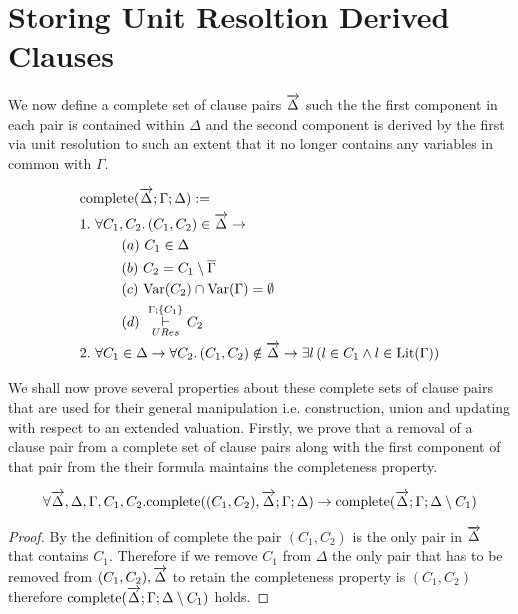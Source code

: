 \section{Storing Unit Resoltion Derived Clauses}

We now define a complete set of clause pairs $\overrightarrow{\Delta}$ such the the first component in each pair is contained within $\Delta$ and the second component is derived by the first via unit resolution to such an extent that it no longer contains any variables in common with $\Gamma$. \\
\medskip
\begin{mydef}
\begin{align*}
 &\mathrm{complete}(\overrightarrow{\Delta};\Gamma; \Delta) :=  \\
& 1. \ \forall C_1,C_2.  \, (C_1, C_2) \in \overrightarrow{\Delta} \to \\
& \hspace{30pt}  (a) \ C_1 \in \Delta \\
& \hspace{30pt}  (b) \ C_2 = C_1 \setminus \overline{\Gamma} \\
& \hspace{30pt}  (c) \ \mathrm{Var}(C_2) \cap \mathrm{Var}(\Gamma) = \emptyset \\
& \hspace{30pt}  (d) \  \overset{\Gamma;\{C_1 \}}{\underset{URes}{\vdash}} C_2 \\
&2. \ \forall C_1 \in \Delta \to \forall C_2. \, (C_1, C_2 ) \notin \overrightarrow{\Delta} \to \exists l \, (l \in C_1 \wedge l \in \mathrm{Lit}(\Gamma))
\end{align*}

\end{mydef}

We shall now prove several properties about these complete sets of clause pairs that are used for their general manipulation i.e. construction, union and updating with respect to an extended valuation. Firstly, we prove that a removal of a clause pair from a complete set of clause pairs along with the first component of that pair from the their formula maintains the completeness property. \\
\medskip
\begin{mylemma}\label{lem:comprem}
\begin{align*}
\forall \overrightarrow{\Delta},\Delta,\Gamma,C_1,C_2. \mathrm{complete}((C_1, C_2), \overrightarrow{\Delta};\Gamma; \Delta) \to \mathrm{complete}(\overrightarrow{\Delta};\Gamma; \Delta \setminus C_1)
\end{align*}
\begin{proof}
By the definition of complete the pair $(C_1, C_2)$ is the only pair in $\overrightarrow{\Delta}$ that contains $C_1$.  Therefore if we remove $C_1$ from $\Delta$ the only pair that has to be removed from $(C_1, C_2), \overrightarrow{\Delta}$ to retain the completeness property is $(C_1,C_2)$ therefore $\mathrm{complete}(\overrightarrow{\Delta};\Gamma; \Delta \setminus C_1)$ holds.
\end{proof}
\end{mylemma}

